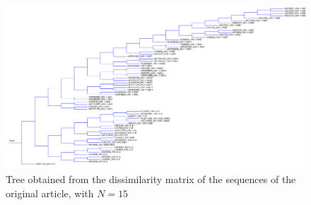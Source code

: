 \documentclass[english,13pt,a4paper]{article}
\theoremstyle{definition}
\theoremstyle{remark}
\theoremstyle{defstyle}
\begin{document}
\begin{figure}[H]
    \centering
    \includegraphics[width=.95\textheight, angle=90]{../Trees/66_tree.png}
    \caption{Tree obtained from the dissimilarity matrix of the sequences of the original article, with $N = 15$}
    \label{fig:tree66}
\end{figure}




\newpage
{}
\printbibliography
\end{document}
